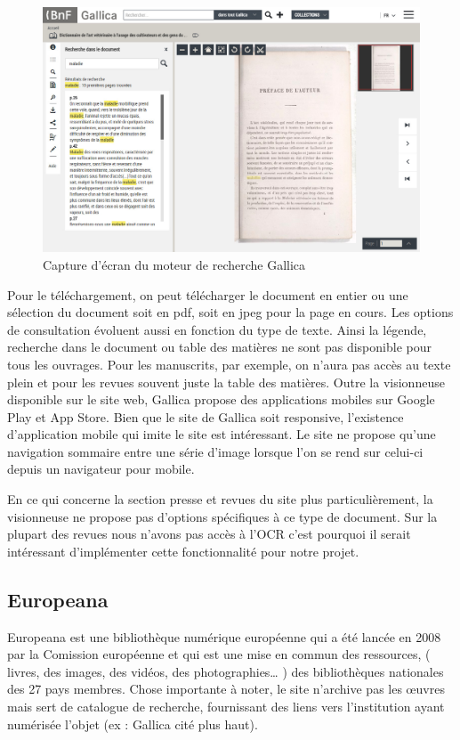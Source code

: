         \begin{figure}[H]
            \centering
            \includegraphics[width=1\textwidth]{figure/screenshot_gallica.jpg}
            \caption{Capture d'écran du moteur de recherche Gallica}
            \label{fig:gallica}
        \end{figure}

        Pour le téléchargement, on peut télécharger le document en entier ou une sélection du document soit en pdf,
        soit en jpeg pour la page en cours. Les options de consultation évoluent aussi en fonction du type de texte.
        Ainsi la légende, recherche dans le document ou table des matières ne sont pas disponible pour tous les ouvrages.
        Pour les manuscrits, par exemple, on n’aura pas accès au texte plein et pour les revues souvent juste la table des matières.
        Outre la visionneuse disponible sur le site web, Gallica propose des applications mobiles sur Google Play et App Store.
        Bien que le site de Gallica soit responsive, l'existence d’application mobile qui imite le site est intéressant.
        Le site ne propose qu’une navigation sommaire entre une série d’image lorsque l’on se rend sur celui-ci depuis un navigateur pour mobile.

        En ce qui concerne la section presse et revues du site plus particulièrement, la visionneuse ne propose
        pas d’options spécifiques à ce type de document. Sur la plupart des revues nous n’avons pas accès à l’OCR
        c’est pourquoi il serait intéressant d’implémenter cette fonctionnalité pour notre projet.

        \subsection{Europeana}
        \label{sec:europeana}
        Europeana est une bibliothèque numérique européenne qui a été lancée en 2008 par la Comission européenne et qui est une mise en commun des ressources,
        ( livres, des images, des vidéos, des photographies… ) des bibliothèques nationales des 27 pays membres. Chose importante à noter,
        le site n’archive pas les œuvres mais sert de catalogue de recherche, fournissant des liens vers l’institution ayant numérisée l’objet 
        (ex : Gallica cité plus haut).

